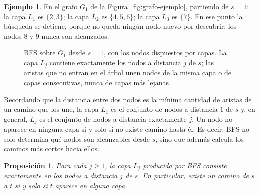\documentclass[12pt, spanish, oneside, openany]{book}
\theoremstyle{uprightplain}
\newtheorem{proposicion}[teorema]{Proposición}
\theoremstyle{definition}
\newtheorem{ejemplo}[teorema]{Ejemplo}
\theoremstyle{remark}
\theoremstyle{definition}
\begin{document}
\begin{ejemplo}
\label{ej:bfs-capas}
En el grafo $G_1$ de la Figura~\ref{fig:grafo-ejemplo}, partiendo de $s=1$: la capa $L_1$ es $\{2,3\}$; la capa $L_2$ es $\{4,5,6\}$; la capa $L_3$ es $\{7\}$. En ese punto la búsqueda se detiene, porque no queda ningún nodo nuevo por descubrir: los nodos $8$ y $9$ nunca son alcanzados.
\end{ejemplo}

\begin{figure}[H]
\centering
{}
\caption{BFS sobre $G_1$ desde $s=1$, con los nodos dispuestos por capas. La
capa $L_j$ contiene exactamente los nodos a distancia $j$ de $s$; las aristas
que no entran en el árbol unen nodos de la misma capa o de capas consecutivas,
nunca de capas más lejanas.}
\label{fig:bfs-capas}
\end{figure}

Recordando que la distancia entre dos nodos es la mínima cantidad de aristas de un camino que los une, la capa $L_1$ es el conjunto de nodos a distancia $1$ de $s$ y, en general, $L_j$ es el conjunto de nodos a distancia exactamente $j$. Un nodo no aparece en ninguna capa si y solo si no existe camino hasta él. Es decir: BFS no solo determina qué nodos son alcanzables desde $s$, sino que además calcula los caminos más cortos hacia ellos.

\begin{proposicion}
\label{prop:bfs-distancias}
Para cada $j\ge 1$, la capa $L_j$ producida por BFS consiste exactamente en los nodos a distancia $j$ de $s$. En particular, existe un camino de $s$ a $t$ si y solo si $t$ aparece en alguna capa.
\end{proposicion}
\end{document}
